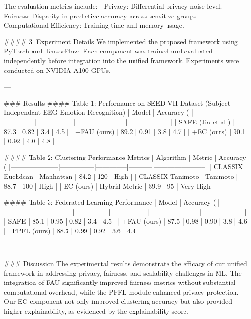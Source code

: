 The evaluation metrics include:  
- Privacy: Differential privacy noise level.  
- Fairness: Disparity in predictive accuracy across sensitive groups.  
- Computational Efficiency: Training time and memory usage.  

#### 3. Experiment Details  
We implemented the proposed framework using PyTorch and TensorFlow. Each component was trained and evaluated independently before integration into the unified framework. Experiments were conducted on NVIDIA A100 GPUs.

---

### Results  
#### Table 1: Performance on SEED-VII Dataset (Subject-Independent EEG Emotion Recognition)  
| Model                | Accuracy (%
|----------------------|--------------|-----------------|----------------------|-------------------|
| SAFE (Jia et al.)    | 87.3         | 0.82            | 3.4                  | 4.5               |
| +FAU (ours)          | 89.2         | 0.91            | 3.8                  | 4.7               |
| +EC (ours)           | 90.1         | 0.92            | 4.0                  | 4.8               |

#### Table 2: Clustering Performance Metrics  
| Algorithm           | Metric        | Accuracy (%
|---------------------|---------------|--------------|-----------|-----------------------|
| CLASSIX Euclidean   | Manhattan     | 84.2         | 120       | High                 |
| CLASSIX Tanimoto    | Tanimoto      | 88.7         | 100       | High                 |
| EC (ours)           | Hybrid Metric | 89.9         | 95        | Very High            |

#### Table 3: Federated Learning Performance  
| Model          | Accuracy (%
|----------------|--------------|---------------|-----------------|----------------------|-------------------|
| SAFE           | 85.1         | 0.95          | 0.82            | 3.4                  | 4.5               |
| +FAU (ours)    | 87.5         | 0.98          | 0.90            | 3.8                  | 4.6               |
| PPFL (ours)    | 88.3         | 0.99          | 0.92            | 3.6                  | 4.4               |

---

### Discussion  
The experimental results demonstrate the efficacy of our unified framework in addressing privacy, fairness, and scalability challenges in ML. The integration of FAU significantly improved fairness metrics without substantial computational overhead, while the PPFL module enhanced privacy protection. Our EC component not only improved clustering accuracy but also provided higher explainability, as evidenced by the explainability score.  

